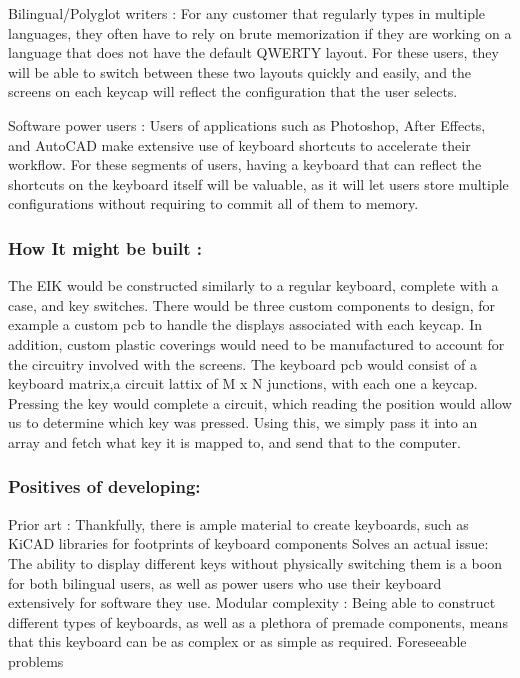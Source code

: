 \documentclass[11pt]{article}
\begin{document}
Bilingual/Polyglot writers : For any customer that regularly types in multiple languages, they often have to rely on brute memorization if they are working on a language that does not have the default QWERTY layout.  For these users, they will be able to switch between these two layouts quickly and easily, and the screens on each keycap will reflect the configuration that the user selects. 

Software power users : Users of applications such as Photoshop, After Effects, and AutoCAD make extensive use of keyboard shortcuts to accelerate their workflow.  For these segments of users, having a keyboard that can reflect the shortcuts on the keyboard itself will be valuable, as it will let users store multiple configurations without requiring to commit all of them to memory.

\subsubsection{How It might be built :}
\label{sec:org85781f3}
The EIK would be constructed similarly to a regular keyboard, complete with a case, and key switches. There would be three custom components to design, for example a custom pcb to handle the displays associated with each keycap.  In addition, custom plastic coverings would need to be manufactured to account for the circuitry involved with the screens.
    The keyboard pcb would consist of a keyboard matrix,a circuit lattix of M x N junctions, with each one a keycap.  Pressing the key would complete a circuit, which reading the position would allow us to determine which key was pressed.  Using this, we simply pass it into an array and fetch what key it is mapped to, and send that to the computer.

\subsubsection{Positives of developing:}
\label{sec:org755305b}
Prior art : Thankfully, there is ample material to create keyboards, such as KiCAD libraries for footprints of keyboard components
Solves an actual issue: The ability to display different keys without physically switching them is a boon for both bilingual users, as well as power users who use their keyboard extensively for software they use.
Modular complexity : Being able to construct different types of keyboards, as well as a plethora of premade components, means that this keyboard can be as complex or as simple as required.
Foreseeable problems
\end{document}
